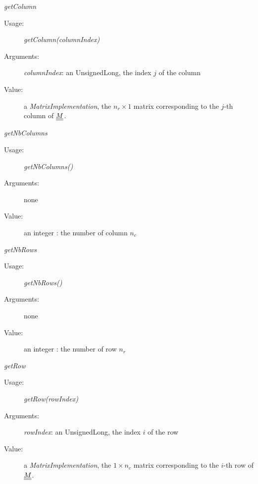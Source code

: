 \begin{description}
\begin{description}
\item \textit{getColumn}
\begin{description}
\item[Usage:] \textit{getColumn(columnIndex)}
\item[Arguments:] \textit{columnIndex}: an UnsignedLong, the index $j$ of the column
\item[Value:] a \textit{MatrixImplementation}, the $n_r\times 1$ matrix corresponding to the $j$-th column of ${\underline{\underline{M}}}$.
\end{description}
\bigskip

\item \textit{getNbColumns}
\begin{description}
\item[Usage:] \textit{getNbColumns()}
\item[Arguments:] none
\item[Value:] an integer : the number of column $n_c$
\end{description}
\bigskip

\item \textit{getNbRows}
\begin{description}
\item[Usage:] \textit{getNbRows()}
\item[Arguments:] none
\item[Value:] an integer : the number of row $n_r$
\end{description}
\bigskip

\item \textit{getRow}
\begin{description}
\item[Usage:] \textit{getRow(rowIndex)}
\item[Arguments:] \textit{rowIndex}: an UnsignedLong, the index $i$ of the row
\item[Value:] a \textit{MatrixImplementation}, the $1\times n_c$ matrix corresponding to the $i$-th row of ${\underline{\underline{M}}}$.
\end{description}
\bigskip


\end{description}
\end{description}
